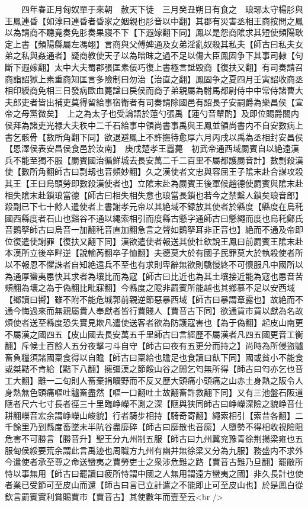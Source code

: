 　　四年春正月匈奴單于來朝　赦天下徒　三月癸丑朔日有食之　琅琊太守楊肜與王鳳連昏【如淳曰連昏者昏家之姻親也肜音以中翻】其郡有災害丞相王商按問之鳳以為請商不聽竟奏免肜奏果寢不下【下遐嫁翻下同】鳳以是怨商隂求其短使頻陽耿定上書【頻陽縣屬左馮翊】言商與父傅婢通及女弟淫亂奴殺其私夫【師古曰私夫女弟之私與姦通者】疑商教使天子以為暗昩之過不足以傷大臣鳳固争下其事司隸【句斷下遐嫁翻】太中大夫蜀郡張匡素佞巧復上書極言詆毁商【復扶又翻】有司奏請召商詣詔獄上素重商知匡言多險制曰勿治【治直之翻】鳳固争之夏四月壬寅詔收商丞相印綬商免相三日發病歐血薨諡曰戾侯而商子弟親屬為駙馬都尉侍中中常侍諸曹大夫郎吏者皆出補吏莫得留給事宿衛者有司奏請除國邑有詔長子安嗣爵為樂昌侯【宣帝之母黨微矣】　上之為太子也受論語於蓮勺張禹【蓮勺音輦酌】及即位賜爵關内侯拜為諸吏光禄大夫秩中二千石給事中領尚書事禹與王鳳並領尚書内不自安數病上書乞骸骨【數所角翻下同】欲退避鳳上不許撫待愈厚六月丙戌以禹為丞相封安昌侯【恩澤侯表安昌侯食邑於汝南】　庚戌楚孝王囂薨　初武帝通西域罽賓自以絶遠漢兵不能至獨不服【罽賓國治循鮮城去長安萬二千二百里不屬都護罽音計】數剽殺漢使【數所角翻師古曰剽刼也音頻妙翻】久之漢使者文忠與容屈王子隂末赴合謀攻殺其王【王曰烏頭勞即數殺漢使者也】立隂末赴為罽賓王後軍候趙德使罽賓與隂末赴相失隂末赴鎖琅當德【師古曰相失相失意也琅當長鎖也若今之禁繫人鎖矣琅音郎】殺副已下七十餘人遣使者上書謝孝元帝以其絶域不録放其使者於縣度【縣度在烏秅國西縣度者石山也谿谷不通以繩索相引而度縣古懸字通師古曰懸繩而度也烏秅鄭氏音鷃拏師古曰烏音一加翻秅音直加翻急言之聲如鷃拏耳非正音也】絶而不通及帝即位復遣使謝罪【復扶又翻下同】漢欲遣使者報送其使杜欽說王鳳曰前罽賓王隂末赴本漢所立後卒畔逆【說輸芮翻卒子恤翻】夫德莫大於有國子民罪莫大於執殺使者所以不報恩不懼誅者自知絶遠兵不至也有求則卑辭無欲則驕慢終不可懷服凡中國所以為通厚蠻夷㥦快其求者為壤比而為寇【師古曰比近也為其土壤接近能為寇也㥦音苦頰翻為壤之為于偽翻比毗寐翻】今縣度之阸非罽賓所能越也其鄉慕不足以安西域【鄉讀曰嚮】雖不附不能危城郭前親逆節惡暴西域【師古曰暴謂章露也】故絶而不通今悔過來而無親屬貴人奉獻者皆行賈賤人【賈音古下同】欲通貨市買以獻為名故煩使者送至縣度恐失實見欺凡遣使送客者欲為防護寇害也【為于偽翻】起皮山南更不屬漢之國四五【皮山國去長安萬五千里師古曰言經歷不屬漢者凡四五國更音工衡翻】斥候士百餘人五分夜擊刁斗自守【師古曰夜有五更分而持之】尚時為所侵盜驢畜負糧須諸國稟食得以自贍【師古曰稟給也贍足也食讀曰飤下同】國或貧小不能食或桀黠不肯給【黠下八翻】擁彊漢之節餒山谷之閒乞匄無所得【師古曰匄亦乞也音工大翻】離一二旬則人畜棄捐曠野而不反又歷大頭痛小頭痛之山赤土身熱之阪令人身熱無色頭痛嘔吐驢畜盡然【嘔一口翻吐土故翻畜許救翻下同】又有三池盤石阪道陿者尺六七寸長者徑三十里臨峥嶸不測之深【陿與狭同師古曰峥嶸深險之貌峥音仕耕翻嶸音宏余謂峥嶸山峻貌】行者騎步相持【騎奇寄翻】繩索相引【索昔各翻】二千餘里乃到縣度畜墜未半阬谷盡靡碎【師古曰靡散也音縻】人墮勢不得相收視險阻危害不可勝言【勝音升】聖王分九州制五服【師古曰九州冀兖豫青徐荆揚梁雍也五服甸侯綏要荒余謂此言禹迹也周職方九州有幽并無徐梁又分為九服】務盛内不求外今遣使者承至尊之命送蠻夷之賈勞吏士之衆涉危難之路【賈音古難乃旦翻】罷敝所恃以事無用【師古曰罷讀曰疲所恃謂中國之人無用謂遠方蠻夷之國】非久長計也使者業已受節可至皮山而還【師古曰言已立計遣之不能即止可至皮山也】於是鳳白從欽言罽賓實利賞賜賈市【賈音古】其使數年而壹至云<br />
